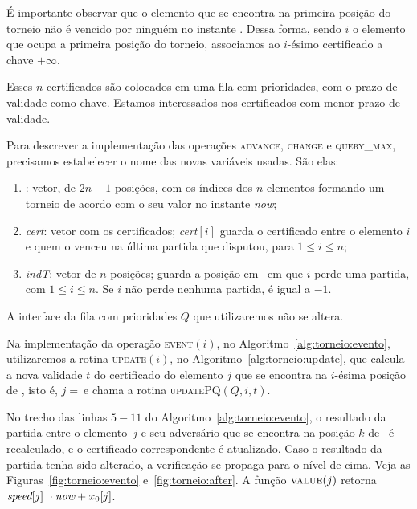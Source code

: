 

É importante observar que o elemento que se encontra na primeira posição do torneio não é vencido
por ninguém no instante \now.
Dessa forma, sendo $i$ o elemento que ocupa a primeira posição do torneio, associamos ao $i$-ésimo
certificado a chave $+\infty$.

Esses $n$ certificados são colocados em uma fila com prioridades, com o prazo de validade como
chave.
Estamos interessados nos certificados com menor prazo de validade.

Para descrever a implementação das operações \textsc{advance}, \textsc{change} e \textsc{query\_max}, precisamos estabelecer o nome das novas variáveis usadas.
São elas:
\begin{enumerate}
    \item \torneio: vetor, de $2n - 1$ posições, com os índices dos
    $n$ elementos formando um torneio de acordo com o seu valor no
    instante \textit{now};

    \item \textit{cert}: vetor com os certificados;
    \textit{cert}$[i]$ guarda o certificado entre o elemento $i$ e
    quem o venceu na última partida que disputou, para $1 \leq i \leq n$;

    \item \textit{indT}: vetor de $n$ posições; \indt[$i$] guarda a
    posição em \torneio~em que $i$ perde uma partida, com $1 \leq i
    \leq n$.
    Se $i$ não perde nenhuma partida, \indt[$i$] é igual a $-1$.
\end{enumerate}

A interface da fila com prioridades $Q$ que utilizaremos não se altera.

Na implementação da operação \textsc{event}$(i)$, no Algoritmo~\ref{alg:torneio:evento},
utilizaremos a rotina \textsc{update}$(i)$, no Algoritmo~\ref{alg:torneio:update}, que calcula a
nova validade $t$ do certificado do elemento $j$ que se encontra na $i$-ésima posição de \torneio,
isto é, $j=~$\torneio[$i$] e chama a rotina \textsc{updatePQ}$(Q, i, t)$.





No trecho das linhas $5 - 11$ do Algoritmo~\ref{alg:torneio:evento}, o resultado da partida entre o
elemento~$j$ e seu adversário que se encontra na posição $k$ de \torneio~é recalculado, e o
certificado correspondente é atualizado.
Caso o resultado da partida tenha sido alterado, a verificação se propaga para o nível de cima.
Veja as Figuras~\ref{fig:torneio:evento} e~\ref{fig:torneio:after}.
A função $\Call{value}{j}$ retorna ${\textit{speed}[j]~\cdot\textit{now} + x_0[j]}$.

